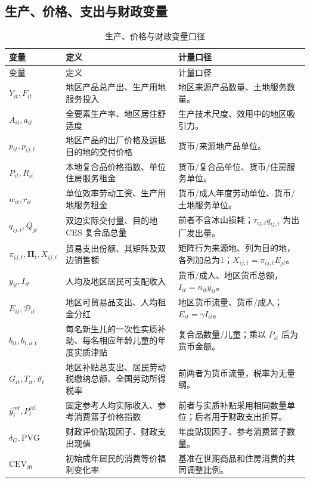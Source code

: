 \documentclass[UTF8,a4paper,zihao=-4,fontset=windows]{ctexart}
\numberwithin{equation}{section}
\begin{document}
\subsection{生产、价格、支出与财政变量}
\small
\begin{longtable}{L{0.23\textwidth}L{0.43\textwidth}L{0.24\textwidth}}
\caption{生产、价格与财政变量口径}\label{tab:notation-production}\\
\toprule
变量 & 定义 & 计量口径\\
\midrule
\endfirsthead
\toprule
变量 & 定义 & 计量口径\\
\midrule
\endhead
\bottomrule
\endfoot
$Y_{it},F_{it}$ & 地区产品总产出、生产用地服务投入 & 地区来源产品数量、土地服务数量。\\
$A_{it},a_{it}$ & 全要素生产率、地区居住舒适度 & 生产技术尺度、效用中的地区吸引力。\\
$p_{it},p_{ij,t}$ & 地区产品的出厂价格及运抵目的地的交付价格 & 货币/来源地产品单位。\\
$P_{it},R_{it}$ & 本地复合品价格指数、单位住房服务租金 & 货币/复合品单位、货币/住房服务单位。\\
$w_{it},r_{it}$ & 单位效率劳动工资、生产用地服务租金 & 货币/成人年度劳动单位、货币/土地服务单位。\\
$q_{ij,t},Q_{jt}$ & 双边实际交付量、目的地 CES 复合品总量 & 前者不含冰山损耗；$\tau_{ij,t}q_{ij,t}$ 为出厂发出量。\\
$\pi_{ij,t},\bm\Pi_t,X_{ij,t}$ & 贸易支出份额、其矩阵及双边销售额 & 矩阵行为来源地、列为目的地，各列加总为1；$X_{ij,t}=\pi_{ij,t}E_{jt}$。\\
$y_{it},I_{it}$ & 人均及地区居民可支配收入 & 货币/成人、地区货币总额，$I_{it}=n_{it}y_{it}$。\\
$E_{it},\mathcal D_{it}$ & 地区可贸易品支出、人均租金分红 & 地区货币流量、货币/成人；$E_{it}=\gamma I_{it}$。\\
$b_{it},b_{i,a,t}$ & 每名新生儿的一次性实质补助、每名相应年龄儿童的年度实质津贴 & 复合品数量/儿童；乘以 $P_{it}$ 后为货币金额。\\
$G_{it},T_{it},\vartheta_t$ & 地区补贴总支出、居民劳动税缴纳总额、全国劳动所得税率 & 前两者为货币流量，税率为无量纲。\\
$\bar y_i^{\mathrm{ref}},P_t^{\mathrm{ref}}$ & 固定参考人均实际收入、参考消费篮子价格指数 & 前者与实质补贴采用相同数量单位；后者用于财政支出折算。\\
$\delta_G,\mathrm{PVG}$ & 财政评价贴现因子、财政支出现值 & 年度贴现因子、参考消费篮子数量。\\
$\mathrm{CEV}_{i0}$ & 初始成年居民的消费等价福利变化率 & 基准在世期商品和住房消费的共同调整比例。\\
\end{longtable}
\normalsize
\end{document}
